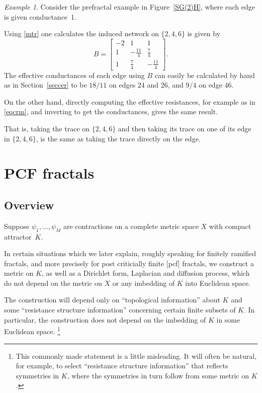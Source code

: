 \documentclass[a4paper]{amsart}
\theoremstyle{plain}
\theoremstyle{definition}
\theoremstyle{remark}
\newtheorem{example}[theorem]{Example}
\begin{document}
\begin{example} Consider the prefractal example in Figure~\ref{SG(2)H}, where each edge is given conductance~1.  

Using \eqref{mtr} one calculates the induced network on $ \{2,4,6\} $ is given by 
\[ 
B = \begin{bmatrix}  -2 & 1 & 1 \\ 1 & -\frac{11}{4} & \frac{7}{4} \\ 1 & \frac{7}{4} & -\frac{11}{4}
\end{bmatrix}.
\]
The effective conductances of each edge using $ B $ can easily be calculated by hand as in Section~\ref{seccer} to be  $ 18/11 $ on edges 24 and 26, and $ 9/4 $ on edge 46.

On the other hand, directly computing the effective resistances, for example as in \eqref{eqcrm},   and inverting to get the conductances, gives the same result.

That is,  taking the trace on  $ \{2,4,6\} $ and then taking its trace  on one of its edge in $ \{2,4,6\} $,  is the same as
taking the trace directly on  the edge.
\end{example} 


\section{\textbf{PCF fractals}}

\subsection{Overview}\label{secovpcf}

Suppose $ \psi_1,\dots,\psi_M $ are contractions on a complete metric space $ X $ with compact attractor~$ K $.  

In certain situations which we later explain, roughly speaking for finitely ramified fractals, and more precisely for post criticially finite [pcf]  fractals, we construct  a  metric  on $ K $, as well as a Dirichlet form, Laplacian and diffusion process, which do  not depend on the metric on $ X $ or any imbedding of  $ K $ into Euclidean space.     

The construction will depend only on ``topological information'' about $ K $ and some ``resistance structure  information'' concerning  certain finite  subsets of $ K $.   In particular, the construction does not depend on the imbedding  of $ K $ in some Euclidean space.%
\footnote{This commonly made statement is a little misleading.   It will often be natural, for example,  to select ``resistance structure  information'' that reflects symmetries in $ K $, where the symmetries  in turn follow from  some metric on $ K$.}
\end{document}
